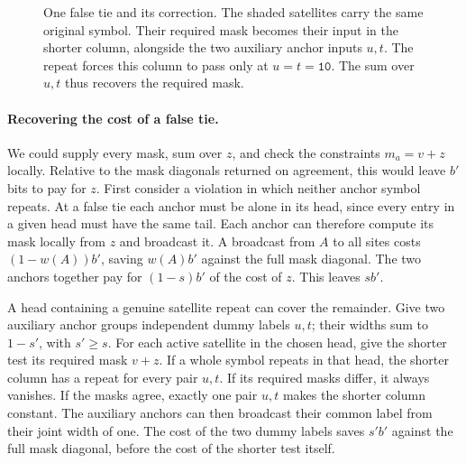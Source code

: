\begin{figure}[!htbp]
\centering
{}
\caption{One false tie and its correction. The shaded satellites carry
the same original symbol. Their required mask becomes their input in
the shorter column, alongside the two auxiliary anchor inputs \(u,t\).
The repeat forces this column to pass only at \(u=t=\mathtt{10}\).
The sum over \(u,t\) thus recovers the required mask.}
\label{fig:example}
\end{figure}

\paragraph{Recovering the cost of a false tie.}
We could supply every mask, sum over \(z\), and check the constraints
\(m_a=v+z\) locally. Relative to the mask diagonals returned on
agreement, this would leave \(b'\) bits to pay for \(z\). First
consider a violation in which neither anchor symbol repeats. At a
false tie each anchor must be alone in its head, since every entry in
a given head must have the same tail. Each anchor can therefore
compute its mask locally from \(z\) and broadcast it. A broadcast
from \(A\) to all sites costs \((1-w(A))b'\), saving \(w(A)b'\) against
the full mask diagonal. The two anchors together pay for
\((1-s)b'\) of the cost of \(z\). This leaves \(sb'\).

A head containing a genuine satellite repeat can cover the remainder.
Give two auxiliary anchor groups independent dummy labels \(u,t\);
their widths sum to \(1-s'\), with \(s'\ge s\). For each active
satellite in the chosen head, give the shorter test its required mask
\(v+z\). If a whole symbol repeats in that head, the shorter column
has a repeat for every pair \(u,t\). If its required masks differ, it
always vanishes. If the masks agree, exactly one pair \(u,t\) makes
the shorter column constant. The auxiliary anchors can then broadcast
their common label from their joint width of one. The cost of the two
dummy labels saves \(s'b'\) against the full mask diagonal, before
the cost of the shorter test itself.

